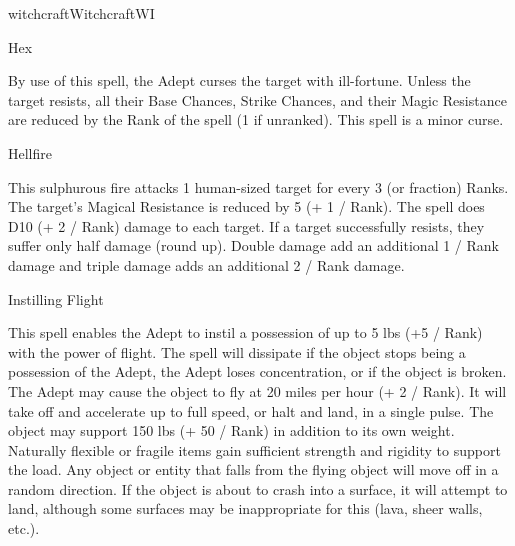 \begin{College}[1.1]{witchcraft}{Witchcraft}{WI}
\begin{spell}[S-12]{Hex}

\begin{effects}
By use of this spell, the Adept curses the target with ill-fortune.
Unless the target resists, all their Base Chances, Strike Chances, and
their Magic Resistance are reduced by the Rank of the spell (1 if
unranked). This spell is a minor curse.
\end{effects}
\end{spell}

\begin{spell}[S-13]{Hellfire}

\begin{effects}
This sulphurous fire attacks 1 human-sized target for every 3 (or
fraction) Ranks. The target’s Magical Resistance is reduced by 5 (+ 1
/ Rank).  The spell does D10 (+ 2 / Rank) damage to each target.  If a
target successfully resists, they suffer only half damage (round up).
Double damage add an additional 1 / Rank damage and triple damage adds
an additional 2 / Rank damage.
\end{effects}
\end{spell}

\begin{spell}[S-14]{Instilling Flight}

\begin{effects}
This spell enables the Adept to instil a possession of up to 5 lbs (+5
/ Rank) with the power of flight.  The spell will dissipate if the
object stops being a possession of the Adept, the Adept loses
concentration, or if the object is broken.  The Adept may cause the
object to fly at 20 miles per hour (+ 2 / Rank).  It will take off and
accelerate up to full speed, or halt and land, in a single pulse. The
object may support 150 lbs (+ 50 / Rank) in addition to its own
weight.  Naturally flexible or fragile items gain sufficient strength
and rigidity to support the load.  Any object or entity that falls
from the flying object will move off in a random direction.  If the
object is about to crash into a surface, it will attempt to land,
although some surfaces may be inappropriate for this (lava, sheer
walls, etc.).
\end{effects}
\end{spell}


\end{College}
